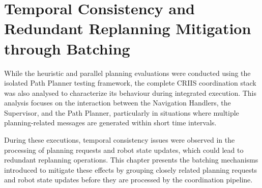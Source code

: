\chapter{Temporal Consistency and Redundant Replanning Mitigation through Batching} 
\label{chap:temporal_consistency_batching}
\hspace{\parindent}
While the heuristic and parallel planning evaluations were conducted using the isolated Path Planner
testing framework, the complete CRIIS coordination stack was also analysed to characterize its
behaviour during integrated execution. This analysis focuses on the interaction between the
Navigation Handlers, the Supervisor, and the Path Planner, particularly in situations where multiple
planning-related messages are generated within short time intervals.

During these executions, temporal consistency issues were observed in the processing of planning
requests and robot state updates, which could lead to redundant replanning operations. This chapter
presents the batching mechanisms introduced to mitigate these effects by grouping closely related
planning requests and robot state updates before they are processed by the coordination pipeline.



